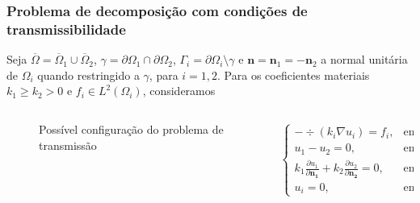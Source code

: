 \documentclass[portuguese,notheorems]{beamer}
\begin{document}
\begin{frame}\frametitle{Problema de decomposição com condições de transmissibilidade}
    Seja \(\overline{\Omega} = \overline{\Omega}_1 \cup \overline{\Omega}_2\), \(\gamma = \partial\Omega_1 \cap \partial \Omega_2\), \(\Gamma_i = \partial\Omega_i \setminus \gamma\) e \(\mathbf{n} = \mathbf{n}_1 = -\mathbf{n}_2\) a normal unitária de \(\Omega_i\) quando restringido a \(\gamma\), para \(i=1,2\). Para os coeficientes materiais \(k_1 \geq k_2 > 0\) e \(f_i \in L^2(\Omega_i)\), consideramos

    \begin{columns}[T] %
        \begin{column}{.48\textwidth}
        \centering
            \begin{figure}
            \caption{Possível configuração do problema de transmissão}
            \end{figure}
        \end{column}%
        \hfill%
        \begin{column}{.48\textwidth}
        \begin{align}\label{decomp_prob}
            \begin{cases}
                - \div \left(k_i \nabla u_i\right) = f_i, & \text{em }\Omega_i\\
                u_1 - u_2 = 0, & \text{em }\gamma\\
                k_1 \frac{\partial u_1}{\partial \mathbf{n_1}} + k_2 \frac{\partial u_2}{\partial  \mathbf{n_2}} = 0, & \text{em }\gamma\\
                u_i = 0, & \text{em }\Gamma_i,
            \end{cases}
        \end{align}
        \end{column}%
        \end{columns}
\end{frame}
\end{document}

